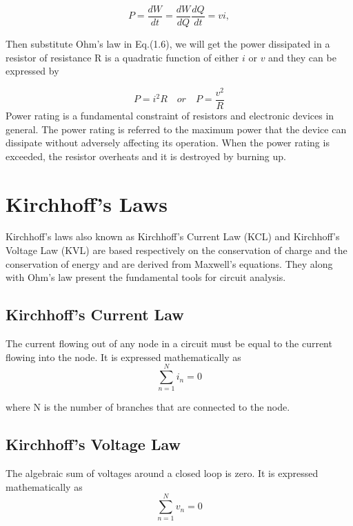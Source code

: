 \documentclass[a4 paper]{article}
\numberwithin{equation}{section}
\newcommand{\0}{\mathbf{0}}
\begin{document}
\begin{equation}
P = \frac{dW}{dt} = \frac{dW}{dQ}\frac{dQ}{dt}=vi,
\end{equation}

Then substitute Ohm's law in Eq.(1.6), we will get the power dissipated in a resistor of resistance R is a quadratic function of either $i$ or $v$ and they can be expressed by

\begin{equation}
P = i^2R \quad or \quad P = \frac{v^2}{R}
\end{equation}
Power rating is a fundamental constraint of resistors and electronic devices in general. The power rating is referred to the maximum power that the device can dissipate without adversely affecting its operation. When the power rating is exceeded, the resistor overheats and it is destroyed by burning up. 





\section{Kirchhoff's Laws}
Kirchhoff's laws also known as Kirchhoff's Current Law (KCL) and Kirchhoff's Voltage Law (KVL) are based respectively on the conservation of charge and the conservation of energy and are derived from Maxwell's equations. They along with Ohm's law present the fundamental tools for circuit analysis.
\subsection{Kirchhoff's Current Law}
The current flowing out of any node in a circuit
must be equal to the current flowing into the node. It is expressed mathematically as
\begin{equation}
\sum_{n=1}^{N}i_n=0
\end{equation}

where N is the number of branches that are connected to the node. 
\subsection{Kirchhoff's Voltage Law}
The algebraic sum of voltages around a closed loop is zero. It is expressed mathematically as
\begin{equation}
\sum_{n=1}^{N}v_n=0
\end{equation}
\end{document}
